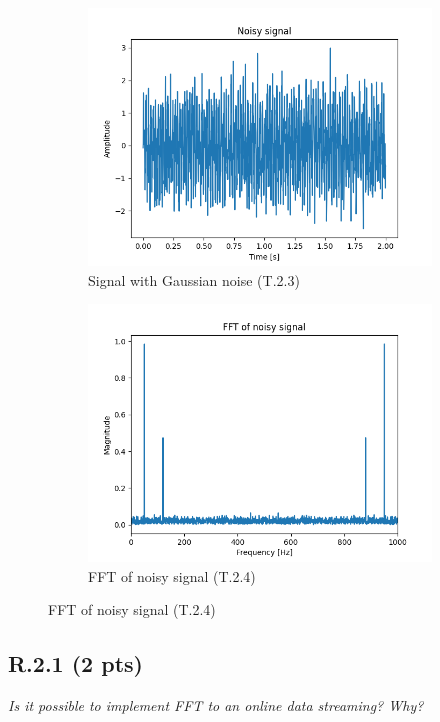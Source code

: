 \documentclass{article}
\begin{document}
\begin{figure}[H]
\medskip
\begin{subfigure}{0.45\linewidth}
  \includegraphics[width=\linewidth]{results/figures/task2_3_noisy_signal.png}
  \caption{Signal with Gaussian noise (T.2.3)}
\end{subfigure}\hfill
\begin{subfigure}{0.45\linewidth}
  \includegraphics[width=\linewidth]{results/figures/task2_4_noisy_spectrum.png}
  \caption{FFT of noisy signal (T.2.4)}
\end{subfigure}
\end{figure}

\subsection*{R.2.1 (2 pts)}
\emph{Is it possible to implement FFT to an online data streaming? Why?}
\end{document}

